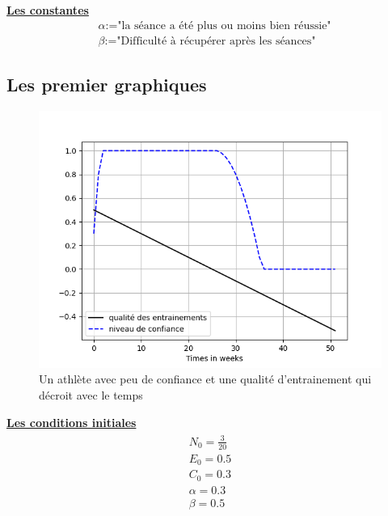 \documentclass[
]{article}
\begin{document}
	\underline{\textbf{Les constantes}}
	\newline
	\begin{align}
		&\text{$\alpha$:="la séance a été plus ou moins bien réussie"} \\
		&\text{$\beta$:="Difficulté à récupérer après les séances"}	\end{align}
	
	\hypertarget{ss2}{%
	\subsection{Les premier graphiques }\label{ss2}}
		
		\begin{figure}[H]
			\centering
			\includegraphics[width=\textwidth]{Graph1SImu1}
			\caption{Un athlète avec peu de confiance et une qualité d'entrainement qui décroit avec le temps}
			\label{fig:nom_figure}
		\end{figure}
		
		\underline{\textbf{Les conditions initiales}}
		\begin{align*}
			\boxed{\begin{array}{c} N_0=\frac{3}{20} \\ E_0=0.5 \\
					C_0=0.3 \\
				\alpha=0.3 \\
				\beta=0.5
				\end{array}}
		\end{align*}
\end{document}
